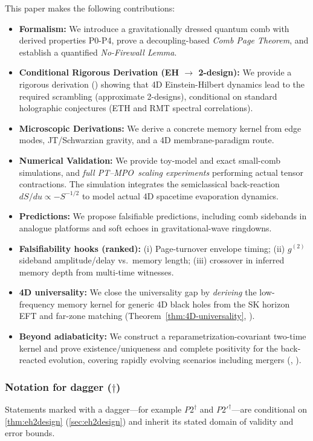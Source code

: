 \documentclass[11pt,a4paper]{article}
\newcommand{\ptmpo}{PT--MPO}
\theoremstyle{plain}
\theoremstyle{definition}
\theoremstyle{remark}
\begin{document}
This paper makes the following contributions:
\begin{itemize}[leftmargin=*]
    \item \textbf{Formalism:} We introduce a gravitationally dressed quantum comb with derived properties P0-P4, prove a decoupling-based \emph{Comb Page Theorem}, and establish a quantified \emph{No-Firewall Lemma}.
    \item \textbf{Conditional Rigorous Derivation (EH $\to$ 2-design):} We provide a rigorous derivation () showing that 4D Einstein-Hilbert dynamics lead to the required scrambling (approximate 2-designs), conditional on standard holographic conjectures (ETH and RMT spectral correlations).
    \item \textbf{Microscopic Derivations:} We derive a concrete memory kernel from edge modes, JT/Schwarzian gravity, and a 4D membrane-paradigm route.
    \item \textbf{Numerical Validation:} We provide toy-model and exact
        small-comb simulations, and \emph{full \ptmpo\ scaling experiments}
        performing actual tensor contractions. The simulation integrates the 
        semiclassical back-reaction $dS/du \propto -S^{-1/2}$ to model 
        actual 4D spacetime evaporation dynamics.
    \item \textbf{Predictions:} We propose falsifiable predictions, including comb sidebands in analogue platforms and soft echoes in gravitational-wave ringdowns.
  \item \textbf{Falsifiability hooks (ranked):} (i) Page-turnover envelope timing;
        (ii) $g^{(2)}$ sideband amplitude/delay vs.\ memory length; (iii) crossover
        in inferred memory depth from multi-time witnesses.
  \item \textbf{4D universality:} We close the universality gap by \emph{deriving} the low-frequency memory kernel for generic 4D black holes from the SK horizon EFT and far-zone matching (Theorem~\ref{thm:4D-universality}, ).
  \item \textbf{Beyond adiabaticity:} We construct a reparametrization-covariant two-time kernel and prove existence/uniqueness and complete positivity for the back-reacted evolution, covering rapidly evolving scenarios including mergers (, ).
\end{itemize}

\subsubsection{Notation for dagger ($\dagger$)}
Statements marked with a dagger---for example $P2^\dagger$ and $P2'^\dagger$---are conditional on \cref{thm:eh2design} (\cref{sec:eh2design}) and inherit its stated domain of validity and error bounds.
\end{document}
